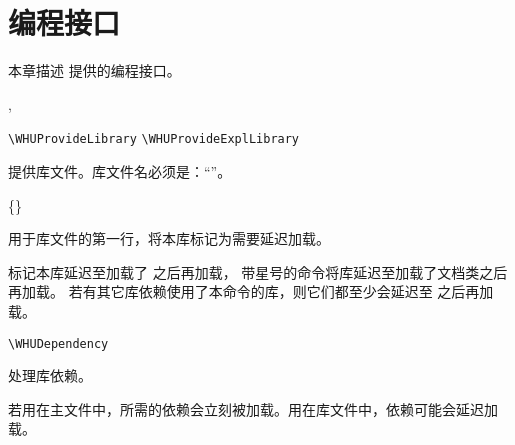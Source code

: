 \documentclass{whudoc}
\begin{document}



\chapter{编程接口}

本章描述 \WhuTeX 提供的编程接口。

\begin{function}[module=whu]{\WHUProvideLibrary,\WHUProvideExplLibrary}
\begin{syntax}
  \verb|\WHUProvideLibrary|      
  \verb|\WHUProvideExplLibrary|    
\end{syntax}
提供库文件。库文件名必须是：“”。
\end{function}

\begin{function}[module=whu]{\WHULibraryDelayedUntil}
  \begin{syntax}
    \V\WHULibraryDelayedUntil   {}
    \V\WHULibraryDelayedUntil * \{\}
    \V\WHULibraryDelayedUntil * 
  \end{syntax}
用于库文件的第一行，将本库标记为需要延迟加载。

标记本库延迟至加载了  之后再加载，
带星号的命令将库延迟至加载了文档类之后再加载。
若有其它库依赖使用了本命令的库，则它们都至少会延迟至  之后再加载。
\end{function}

\begin{function}[module=whu]{\WHUDependency}
\begin{syntax}
  \verb|\WHUDependency| 
\end{syntax}
处理库依赖。

若用在主文件中，所需的依赖会立刻被加载。用在库文件中，依赖可能会延迟加载。
\end{function}
\end{document}
